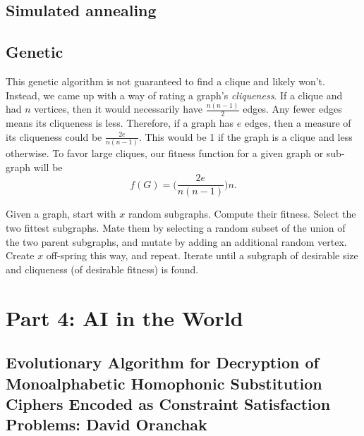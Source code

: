 \documentclass[11pt]{amsart}
\begin{document}
\subsection*{Simulated annealing}


\subsection*{Genetic}
This genetic algorithm is not guaranteed to find a clique and likely won't.
Instead, we came up with a way of rating a graph's \emph{cliqueness}. If a
clique and had $n$ vertices, then it would necessarily have $\frac{n(n-1)}{2}$
edges. Any fewer edges means its cliqueness is less. Therefore, if a graph has $e$
edges, then a measure of its cliqueness could be $\frac{2e}{n(n-1)}$. This would be 1 if
the graph is a clique and less otherwise. To favor large cliques, our fitness
function for a given graph or sub-graph will be
\[
f(G) = \Bigg(\frac{2e}{n(n-1)}\Bigg)n.
\]

Given a graph, start with $x$ random subgraphs. Compute their fitness.
Select the two fittest subgraphs. %
Mate them by selecting a random subset of the union of
the two parent subgraphs, and mutate by adding an additional random vertex.
Create $x$ off-spring this way, and repeat. Iterate until a subgraph of desirable
size and cliqueness (of desirable fitness) is found.


\section*{Part 4: AI in the World}

\subsection*{Evolutionary Algorithm for Decryption of Monoalphabetic Homophonic
Substitution Ciphers Encoded as Constraint Satisfaction Problems: David
Oranchak}
\end{document}
